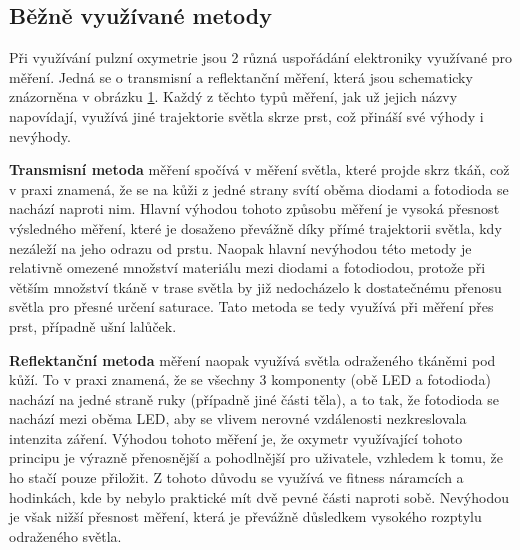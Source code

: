 \subsection {Běžně využívané metody}
Při využívání pulzní oxymetrie jsou 2 různá uspořádání elektroniky využívané pro měření. Jedná se o transmisní a reflektanční měření, která jsou schematicky znázorněna v obrázku \ref{fig:Metody}. Každý z těchto typů měření, jak už jejich názvy napovídají, využívá jiné trajektorie světla skrze prst, což přináší své výhody i nevýhody.
\begin{figure}[H]
    \caption []{}
    \def\svgwidth{\columnwidth}
    
    \label{fig:Metody}
\end{figure}
\par \textbf{Transmisní metoda} měření spočívá v měření světla, které projde skrz tkáň, což v praxi znamená, že se na kůži z jedné strany svítí oběma diodami a fotodioda se nachází naproti nim. Hlavní výhodou tohoto způsobu měření je vysoká přesnost výsledného měření, které je dosaženo převážně díky přímé trajektorii světla, kdy nezáleží na jeho odrazu od prstu. Naopak hlavní nevýhodou této metody je relativně omezené množství materiálu mezi diodami a fotodiodou, protože při větším množství tkáně v trase světla by již nedocházelo k dostatečnému přenosu světla pro přesné určení saturace. Tato metoda se tedy využívá při měření přes prst, případně ušní lalůček. %
\par \textbf{Reflektanční metoda} měření naopak využívá světla odraženého tkáněmi pod kůží. To v praxi znamená, že se všechny 3 komponenty (obě LED a fotodioda) nachází na jedné straně ruky (případně jiné části těla), a to tak, že fotodioda se nachází mezi oběma LED, aby se vlivem nerovné vzdálenosti nezkreslovala intenzita záření. Výhodou tohoto měření je, že oxymetr využívající tohoto principu je výrazně přenosnější a pohodlnější pro uživatele, vzhledem k tomu, že ho stačí pouze přiložit. Z tohoto důvodu se využívá ve fitness náramcích a hodinkách, kde by nebylo praktické mít dvě pevné části naproti sobě. Nevýhodou je však nižší přesnost měření, která je převážně důsledkem vysokého rozptylu odraženého světla.
